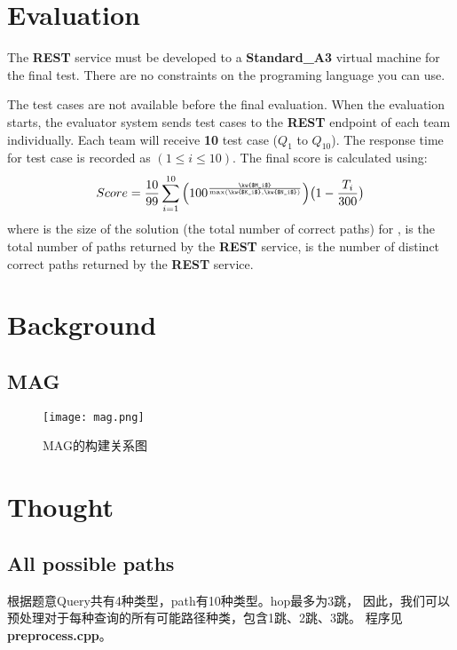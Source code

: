 \documentclass[hyperref,UTF8]{ctexart}
\theoremstyle{definition}
\theoremstyle{remark}
\numberwithin{equation}{subsection}
\newcommand{\Emph}{\textbf}
\begin{document}
\section{Evaluation}
\label{sec:evaluation}

	The \Emph{REST} service must be developed to a \Emph{Standard\_A3} virtual machine for the final test.
	There are no constraints on the programing 	language you can use.
	
	The test cases are not  available before the final evaluation.
	When the evaluation starts, the evaluator system sends test cases
	to the \Emph{REST} endpoint of each team individually.
	Each team will receive \Emph{10} test case ($Q_1$ to $Q_{10}$).
	The response time for test case  is recorded as $(1 \le i \le 10)$.
	The final score is calculated using:
	\[
		Score = \frac{10}{99} \sum_{i=1}^{10} \Big( 100^{\frac{\kw{$M_i$}}{\max(\kw{$K_i$}, \kw{$N_i$})}} \Big) \big( 1 - \frac{T_i}{300} \big)
	\]
	where  is the size of the solution (the total number of correct paths) for ,
	 is the total number of paths returned by the \Emph{REST} service,
	 is the number of distinct correct paths returned by the \Emph{REST} service.
	
\section{Background}
\label{sec:Background}

\subsection{MAG}

	\begin{figure}[H]
	\centering
	\texttt{[image: mag.png]}
    \caption{MAG的构建关系图}
	\end{figure}
	
\section{Thought}	
\label{sec:thought}

\subsection{All possible paths}
\label{subsec:all_possible_paths}

	根据题意Query共有4种类型，path有10种类型。hop最多为3跳，
	因此，我们可以预处理对于每种查询的所有可能路径种类，包含1跳、2跳、3跳。
	程序见\Emph{preprocess.cpp}。
	
\end{document}
